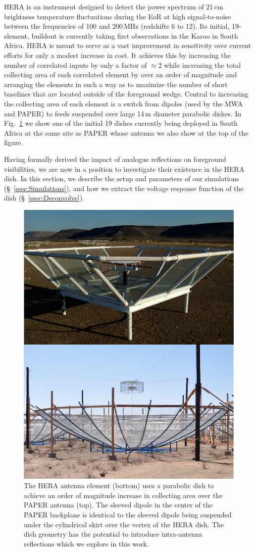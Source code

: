 \documentclass[twocolumn]{emulateapj}
\begin{document}
HERA \citep{Pober:2014,DeBoer:2016} is an instrument designed to detect the power spectrum of 21\,cm brightness temperature fluctuations during the EoR at high signal-to-noise between the frequencies of 100 and 200\,MHz (redshifts 6 to 12). Its initial, 19-element, buildout is currently taking first observations in the Karoo in South Africa. HERA is meant to serve as a vast improvement in sensitivity over current efforts for only a modest increase in cost. It achieves this by increasing the number of correlated inputs by only a factor of $\approx 2$ while increasing the total collecting area of each correlated element by over an order of magnitude and arranging the elements in such a way as to maximize the number of short baselines that are located outside of the foreground wedge. Central to increasing the collecting area of each element is a switch from dipoles (used by the MWA and PAPER) to feeds suspended over large 14\,m diameter parabolic dishes. In Fig.~\ref{fig:AntennaCompare} we show one of the initial 19 dishes currently being deployed in South Africa at the same site as PAPER whose antenna we also show at the top of the figure. 

Having formally derived the impact of analogue reflections on foreground visibilities, we are now in a position to investigate their existence in the HERA dish. In this section, we describe the setup and parameters of our simulations (\S~\ref{ssec:Simulations}), and how we extract the voltage response function of the dish (\S~\ref{ssec:Deconvolve}).


\begin{figure}
\includegraphics[width=.5\textwidth]{figures/PAPER_HERA_compare.jpg}
\caption{The HERA antenna element (bottom) uses a parabolic dish to achieve an order of magnitude increase in collecting area over the PAPER antenna (top). The sleeved dipole in the center of the PAPER backplane is identical to the sleeved dipole being suspended under the cylindrical skirt over the vertex of the HERA dish. The dish geometry has the potential to introduce intra-antenna reflections which we explore in this work.}
\label{fig:AntennaCompare}
\end{figure}
\end{document}
